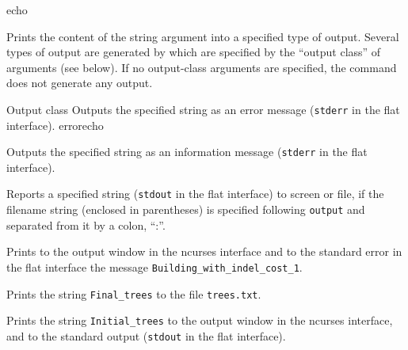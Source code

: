 \begin{command}{echo}{}

	
	\begin{poydescription} 
         Prints the content of the string argument into a specified type of output.
         Several types of output are generated by \poy  which are specified by the
         ``output class'' of arguments (see below). If no output-class arguments are
         specified, the command does not generate any output.
	\end{poydescription}

    \begin{arguments}
           \begin{argumentgroup}{Output class}
            {Outputs the specified string as an error message (\texttt{stderr} in the
            flat interface).}
            {errorecho}

            {Outputs the specified string as an information message (\texttt{stderr} in the
            flat interface).}
            {}

            {Reports a specified string (\texttt{stdout} in the flat interface) to screen or file, 
            if the filename string (enclosed in parentheses) is specified following \texttt{output} 
            and separated from it by a colon, ``:''.}
            {}
           \end{argumentgroup}
    \end{arguments}

	\begin{poyexamples}

            {Prints to the output window in the ncurses interface and to the
            standard error in the flat interface the message 
            \texttt {Building\_with\_indel\_cost\_1}.}

            {Prints the string \texttt{Final\_trees} to the file \texttt{trees.txt}.}

            {Prints the string \texttt{Initial\_trees} to the output window in the
            ncurses interface, and to the standard output (\texttt{stdout} in the flat
            interface).}
    \end{poyexamples}

	\begin{poyalso}
	\end{poyalso}

\end{command}


